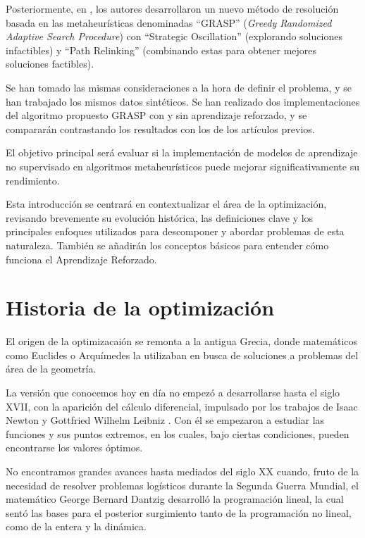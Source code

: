 \documentclass[12pt,a4paper]{book}
\begin{document}
Posteriormente, en \cite{k-Balanced_2}, los autores desarrollaron un nuevo método de resolución basada en las metaheurísticas denominadas ``GRASP'' \cite{GRASP} (\textit{Greedy Randomized Adaptive Search Procedure}) con ``Strategic Oscillation'' \cite{oscillation} (explorando soluciones infactibles) y ``Path Relinking'' \cite{path_relinking} (combinando estas para obtener mejores soluciones factibles).

Se han tomado las mismas consideraciones a la hora de definir el problema, y se han trabajado los mismos datos sintéticos.
Se han realizado dos implementaciones del algoritmo propuesto GRASP con y sin aprendizaje reforzado, y se compararán contrastando los resultados con los de los artículos previos.

El objetivo principal será evaluar si la implementación de modelos de aprendizaje no supervisado en algoritmos metaheurísticos puede mejorar significativamente su rendimiento.

Esta introducción se centrará en contextualizar el área de la optimización, revisando brevemente su evolución histórica, las definiciones clave y los principales enfoques utilizados para descomponer y abordar problemas de esta naturaleza. También se añadirán los conceptos básicos para entender cómo funciona el Aprendizaje Reforzado.


\section{Historia de la optimización}
El origen de la optimizacaión se remonta a la antigua Grecia, donde matemáticos como Euclides o Arquímedes la utilizaban en busca de soluciones a problemas del área de la geometría.

La versión que conocemos hoy en día no empezó a desarrollarse hasta el siglo XVII, con la aparición del cálculo diferencial, impulsado por los trabajos de Isaac Newton y Gottfried Wilhelm Leibniz \cite{Leibniz}. Con él se empezaron a estudiar las funciones y sus puntos extremos,
en los cuales, bajo ciertas condiciones, pueden encontrarse los valores óptimos.

No encontramos grandes avances hasta mediados del siglo XX cuando, fruto de la necesidad de resolver problemas logísticos durante la Segunda Guerra Mundial, el matemático George Bernard Dantzig \cite{Dantzig} desarrolló la programación lineal, la cual sentó las bases para el posterior surgimiento tanto de la programación no lineal, como de la entera y la dinámica.
\end{document}
